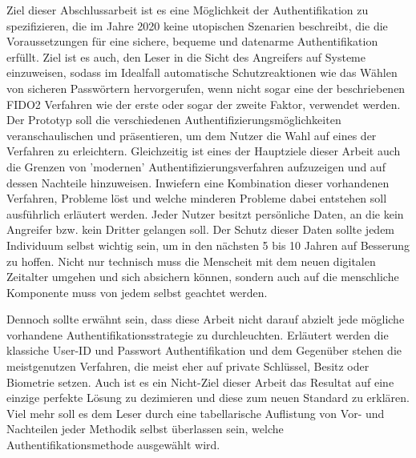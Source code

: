 Ziel dieser Abschlussarbeit ist es eine Möglichkeit der Authentifikation zu spezifizieren, die im Jahre 2020 keine utopischen Szenarien beschreibt, die die Voraussetzungen für eine sichere, bequeme und datenarme Authentifikation erfüllt. Ziel ist es auch, den Leser in die Sicht des Angreifers auf Systeme einzuweisen, sodass im Idealfall automatische Schutzreaktionen wie das Wählen von sicheren Passwörtern hervorgerufen, wenn nicht sogar eine der beschriebenen FIDO2 Verfahren wie der erste oder sogar der zweite Faktor, verwendet werden. Der Prototyp soll die verschiedenen Authentifizierungsmöglichkeiten veranschaulischen und präsentieren, um dem Nutzer die Wahl auf eines der Verfahren zu erleichtern. Gleichzeitig ist eines der Hauptziele dieser Arbeit auch die Grenzen von 'modernen' Authentifizierungsverfahren aufzuzeigen und auf dessen Nachteile hinzuweisen. Inwiefern eine Kombination dieser vorhandenen Verfahren, Probleme löst und welche minderen Probleme dabei entstehen soll ausführlich erläutert werden. Jeder Nutzer besitzt persönliche Daten, an die kein Angreifer bzw. kein Dritter gelangen soll. Der Schutz dieser Daten sollte jedem Individuum selbst wichtig sein, um in den nächsten 5 bis 10 Jahren auf Besserung zu hoffen. Nicht nur technisch muss die Menscheit mit dem neuen digitalen Zeitalter umgehen und sich absichern können, sondern auch auf die menschliche Komponente muss von jedem selbst geachtet werden.

Dennoch sollte erwähnt sein, dass diese Arbeit nicht darauf abzielt jede mögliche vorhandene Authentifikationsstrategie zu durchleuchten. Erläutert werden die klassiche User-ID und Passwort Authentifikation und dem Gegenüber stehen die meistgenutzen Verfahren, die meist eher auf private Schlüssel, Besitz oder Biometrie setzen. Auch ist es ein Nicht-Ziel dieser Arbeit das Resultat auf eine einzige perfekte Lösung zu dezimieren und diese zum neuen Standard zu erklären. Viel mehr soll es dem Leser durch eine tabellarische Auflistung von Vor- und Nachteilen jeder Methodik selbst überlassen sein, welche Authentifikationsmethode ausgewählt wird.
